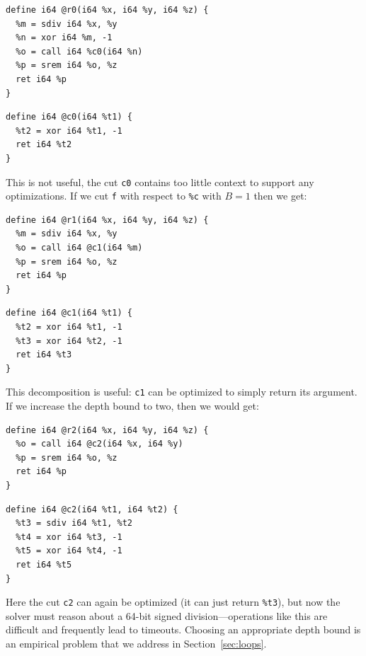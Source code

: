 {\begin{quoting}
\begin{Verbatim}
define i64 @r0(i64 %x, i64 %y, i64 %z) {
  %m = sdiv i64 %x, %y
  %n = xor i64 %m, -1
  %o = call i64 %c0(i64 %n)
  %p = srem i64 %o, %z
  ret i64 %p
}
\end{Verbatim}
\end{quoting}}
{\begin{quoting}
\begin{Verbatim}
define i64 @c0(i64 %t1) {
  %t2 = xor i64 %t1, -1
  ret i64 %t2
}
\end{Verbatim}
\end{quoting}}

This is not useful, the cut \texttt{c0} contains too little context
to support any optimizations.
%
If we cut \texttt{f} with respect to \texttt{\%c} with $B = 1$ then we get:

{\begin{quoting}
\begin{Verbatim}
define i64 @r1(i64 %x, i64 %y, i64 %z) {
  %m = sdiv i64 %x, %y
  %o = call i64 @c1(i64 %m)
  %p = srem i64 %o, %z
  ret i64 %p
}
\end{Verbatim}
\end{quoting}}

{\begin{quoting}
\begin{Verbatim}
define i64 @c1(i64 %t1) {
  %t2 = xor i64 %t1, -1
  %t3 = xor i64 %t2, -1
  ret i64 %t3
}
\end{Verbatim}
\end{quoting}}


This decomposition is useful: \texttt{c1} can be optimized to simply
return its argument.
%
If we increase the depth bound to two, then we would get:


{\begin{quoting}
\begin{Verbatim}
define i64 @r2(i64 %x, i64 %y, i64 %z) {
  %o = call i64 @c2(i64 %x, i64 %y)
  %p = srem i64 %o, %z
  ret i64 %p
}
\end{Verbatim}
\end{quoting}}
{\begin{quoting}
\begin{Verbatim}
define i64 @c2(i64 %t1, i64 %t2) {
  %t3 = sdiv i64 %t1, %t2
  %t4 = xor i64 %t3, -1
  %t5 = xor i64 %t4, -1
  ret i64 %t5
}
\end{Verbatim}
\end{quoting}}


Here the cut \texttt{c2} can again be optimized (it can just return
\texttt{\%t3}), but now the solver must reason about a 64-bit signed
division---operations like this are difficult and frequently lead to
timeouts.
%
Choosing an appropriate depth bound is an empirical problem that
we address in Section~\ref{sec:loops}.


